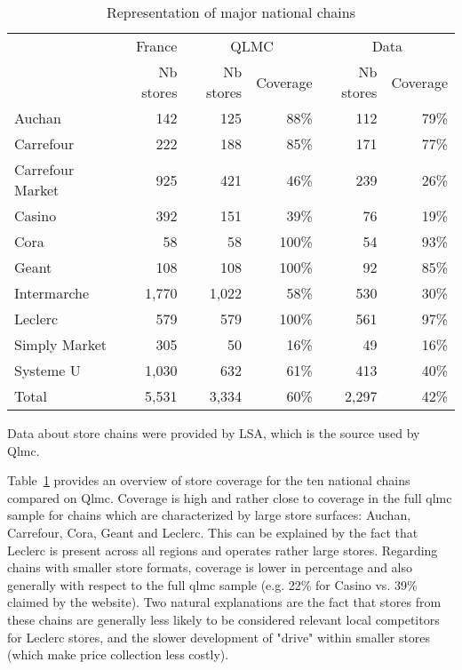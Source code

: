 \documentclass[english]{article}
\begin{document}
\begin{table}[H]
\begin{threeparttable}
\renewcommand{\arraystretch}{0.7}%
\caption{Representation of major national chains}
\label{tab:qlmc_chain_repr}
\small
\begin{tabular}{lr|rr|rr}
\toprule
          & France & \multicolumn{2}{c|}{QLMC} & \multicolumn{2}{c}{Data} \\
          & Nb stores & Nb stores & Coverage & Nb stores & Coverage \\
\midrule
    Auchan & 142   & 125   & 88\%  & 112   & 79\% \\
    Carrefour & 222   & 188   & 85\%  & 171   & 77\% \\
    Carrefour Market & 925   & 421   & 46\%  & 239   & 26\% \\
    Casino & 392   & 151   & 39\%  & 76    & 19\% \\
    Cora  & 58    & 58    & 100\% & 54    & 93\% \\
    Geant & 108   & 108   & 100\% & 92    & 85\% \\
    Intermarche & 1,770 & 1,022 & 58\%  & 530   & 30\% \\
    Leclerc & 579   & 579   & 100\% & 561   & 97\% \\
    Simply Market & 305   & 50    & 16\%  & 49    & 16\% \\
    Systeme U & 1,030 & 632   & 61\%  & 413   & 40\% \\
\midrule		
    Total & 5,531 & 3,334 & 60\%  & 2,297 & 42\% \\
\bottomrule
\bottomrule
\end{tabular}
\begin{tablenotes}
      \small
      \item Data about store chains were provided by LSA, which is the source used by Qlmc.
\end{tablenotes}
\end{threeparttable}
\end{table}

Table~\ref{tab:qlmc_chain_repr} provides an overview of store coverage for the ten national chains compared on Qlmc. Coverage is high and rather close to coverage in the full qlmc sample for chains which are characterized by large store surfaces: Auchan, Carrefour, Cora, Geant and Leclerc. This can be explained by the fact that Leclerc is present across all regions and operates rather large stores. Regarding chains with smaller store formats, coverage is lower in percentage and also generally with respect to the full qlmc sample (e.g. 22\% for Casino vs. 39\% claimed by the website). Two natural explanations are the fact that stores from these chains are generally less likely to be considered relevant local competitors for Leclerc stores, and the slower development of "drive" within smaller stores (which make price collection less costly).
\end{document}
